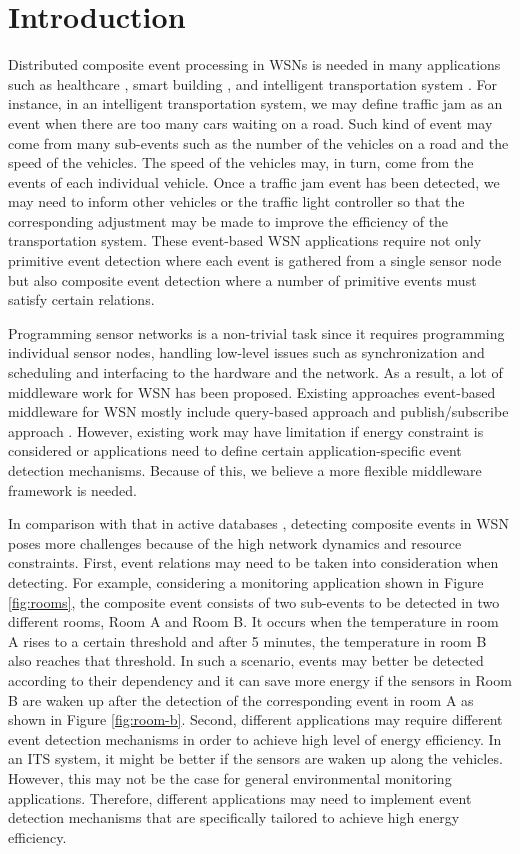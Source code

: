 \section{Introduction}
\label{sec:introduction}
Distributed composite event processing \cite{jector} in WSNs is needed in many applications such as healthcare \cite{lo:ban}, smart building \cite{lynch:shm}, and intelligent transportation system \cite{klein:its}. For instance, in an intelligent transportation system, we may define traffic jam as an event when there are too many cars waiting on a road. Such kind of event may come from many sub-events such as the number of the vehicles on a road and the speed of the vehicles. The speed of the vehicles may, in turn, come from the events of each individual vehicle. Once a traffic jam event has been detected, we may need to inform other vehicles or the traffic light controller so that the corresponding adjustment may be made to improve the efficiency of the transportation system. These event-based WSN applications require not only primitive event detection where each event is gathered from a single sensor node but also composite event detection where a number of primitive events must satisfy certain relations.

Programming sensor networks is a non-trivial task since it requires programming individual sensor nodes, handling low-level issues such as synchronization and scheduling and interfacing to the hardware and the network. As a result, a lot of middleware work for WSN has been proposed. Existing approaches event-based middleware for WSN mostly include query-based approach \cite{tinydb} and publish/subscribe approach \cite{complexevent}. However, existing work may have limitation if energy constraint is considered or applications need to define certain application-specific event detection mechanisms. Because of this, we believe a more flexible middleware framework is needed.

In comparison with that in active databases \cite{samos, snoop}, detecting composite events in WSN poses more challenges because of the high network dynamics and resource constraints. First, event relations may need to be taken into consideration when detecting. For example, considering a monitoring application shown in Figure \ref{fig:rooms}, the composite event consists of two sub-events to be detected in two different rooms, Room A and Room B. It occurs when the temperature in room A rises to a certain threshold and after 5 minutes, the temperature in room B also reaches that threshold. In such a scenario, events may better be detected according to their dependency and it can save more energy if the sensors in Room B are waken up after the detection of the corresponding event in room A as shown in Figure \ref{fig:room-b}. Second, different applications may require different event detection mechanisms in order to achieve high level of energy efficiency. In an ITS system, it might be better if the sensors are waken up along the vehicles. However, this may not be the case for general environmental monitoring applications. Therefore, different applications may need to implement event detection mechanisms that are specifically tailored to achieve high energy efficiency.

